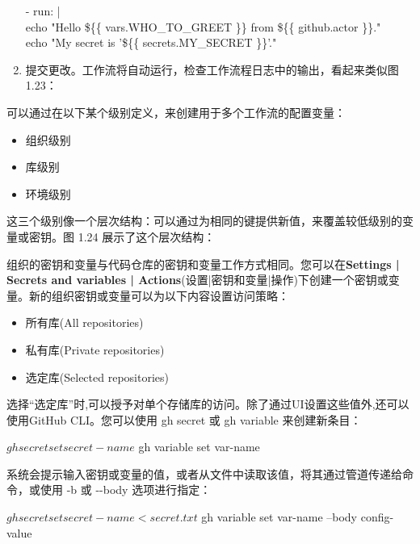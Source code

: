 \begin{enumerate}
\begin{tcolorbox}[ breakable,colback = bashcodebg, colframe= black!50!white]
\scriptsize{
- run: | \\
\hspace*{2em}echo "Hello \$\{\{ vars.WHO\_TO\_GREET \}\}  from \$\{\{ github.actor \}\}." \\
\hspace*{2em}echo "My secret is  '\$\{\{ secrets.MY\_SECRET \}\}'."
}
\end{tcolorbox}

\item 
提交更改。工作流将自动运行，检查工作流程日志中的输出，看起来类似图 1.23：


\end{enumerate}


可以通过在以下某个级别定义，来创建用于多个工作流的配置变量：

\begin{itemize}
\item 
组织级别

\item 
库级别

\item 
环境级别
\end{itemize}

这三个级别像一个层次结构：可以通过为相同的键提供新值，来覆盖较低级别的变量或密钥。图 1.24 展示了这个层次结构：


组织的密钥和变量与代码仓库的密钥和变量工作方式相同。您可以在\textbf{Settings | Secrets and variables | Actions}(设置|密钥和变量|操作)下创建一个密钥或变量。新的组织密钥或变量可以为以下内容设置访问策略：

\begin{itemize}
\item 
所有库(All repositories)

\item 
私有库(Private repositories)

\item 
选定库(Selected repositories)
\end{itemize}

选择“选定库”时,可以授予对单个存储库的访问。除了通过UI设置这些值外,还可以使用GitHub CLI。您可以使用 gh secret 或 gh variable 来创建新条目：

\begin{shell}
$ gh secret set secret-name
$ gh variable set var-name
\end{shell}

系统会提示输入密钥或变量的值，或者从文件中读取该值，将其通过管道传递给命令，或使用 -b 或 -{}-body 选项进行指定：

\begin{shell}
$ gh secret set secret-name < secret.txt
$ gh variable set var-name --body config-value
\end{shell}
